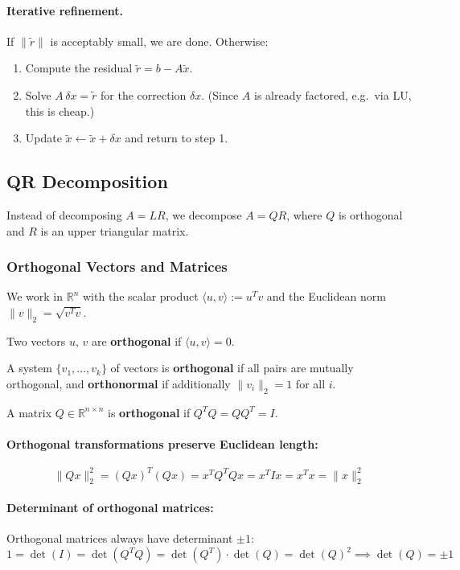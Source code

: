 \documentclass{article}
\begin{document}
\paragraph{Iterative refinement.}
If $\|\tilde{r}\|$ is acceptably small, we are done.  Otherwise:
\begin{enumerate}
  \item Compute the residual $\tilde{r} = b - A\tilde{x}$.
  \item Solve $A\,\delta x = \tilde{r}$ for the correction $\delta x$.
        (Since $A$ is already factored, e.g.\ via LU, this is cheap.)
  \item Update $\tilde{x} \leftarrow \tilde{x} + \delta x$ and return to step 1.
\end{enumerate}

\subsection{QR Decomposition}
Instead of decomposing $A = LR$, we decompose $A = QR$, where $Q$ is orthogonal and $R$ is an upper triangular matrix.

\subsubsection{Orthogonal Vectors and Matrices}
We work in $\mathbb{R}^n$ with the scalar product $\langle u,v \rangle := u^T v$ and the Euclidean norm $\|v\|_2 = \sqrt{v^T v}$.

Two vectors $u$, $v$ are \textbf{orthogonal} if $\langle u,v \rangle = 0$.

A system $\{v_1,\dots,v_k\}$ of vectors is \textbf{orthogonal} if all pairs are mutually orthogonal, and \textbf{orthonormal} if additionally $\|v_i\|_2 = 1$ for all $i$.

A matrix $Q\in \mathbb{R}^{n\times n}$ is \textbf{orthogonal} if $Q^TQ = QQ^T = I$.

\paragraph{Orthogonal transformations preserve Euclidean length:}
\[
\|Qx\|_2^2 = (Qx)^T(Qx) = x^TQ^TQx = x^TIx = x^Tx = \|x\|_2^2
\]

\paragraph{Determinant of orthogonal matrices:} Orthogonal matrices always have determinant $\pm 1$:
\[
1 = \det(I) = \det(Q^TQ) = \det(Q^T)\cdot\det(Q) = \det(Q)^2
\implies \det(Q) = \pm 1
\]
\end{document}
